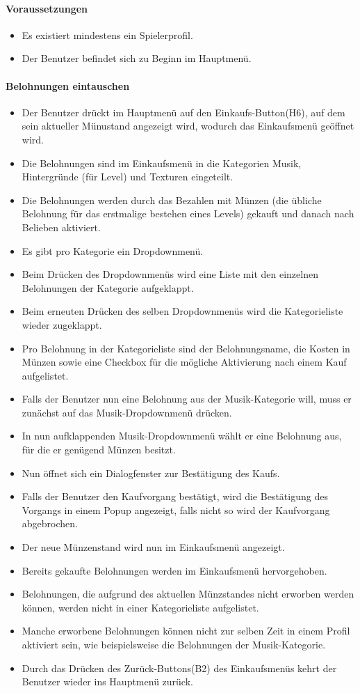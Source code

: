 \paragraph{Voraussetzungen}
\begin{itemize}
	\item Es existiert mindestens ein Spielerprofil.
	\item Der Benutzer befindet sich zu Beginn im Hauptmenü.
\end{itemize}
\paragraph{Belohnungen eintauschen}
\begin{itemize}
	\item Der Benutzer drückt im Hauptmenü auf den Einkaufs-Button(H6), auf dem sein aktueller Münustand angezeigt wird, wodurch das Einkaufsmenü geöffnet wird.
	\item Die Belohnungen sind im Einkaufsmenü in die Kategorien Musik, Hintergründe (für Level) und Texturen eingeteilt.
	\item Die Belohnungen werden durch das Bezahlen mit Münzen (die übliche Belohnung für das erstmalige bestehen eines Levels) gekauft und danach nach Belieben aktiviert.
	\item Es gibt pro Kategorie ein Dropdownmenü.
	\item Beim Drücken des Dropdownmenüs wird eine Liste mit den einzelnen Belohnungen der Kategorie aufgeklappt.
	\item Beim erneuten Drücken des selben Dropdownmenüs wird die Kategorieliste wieder zugeklappt.
	\item Pro Belohnung in der Kategorieliste sind der Belohnungsname, die Kosten in Münzen sowie eine Checkbox für die mögliche Aktivierung nach einem Kauf aufgelistet.
	\item Falls der Benutzer nun eine Belohnung aus der Musik-Kategorie will, muss er zunächst auf das Musik-Dropdownmenü drücken.
	\item In nun aufklappenden Musik-Dropdownmenü wählt er eine Belohnung aus, für die er genügend Münzen besitzt.
	\item Nun öffnet sich ein Dialogfenster zur Bestätigung des Kaufs.
	\item Falls der Benutzer den Kaufvorgang bestätigt, wird die Bestätigung des Vorgangs in einem Popup angezeigt, falls nicht so wird der Kaufvorgang abgebrochen.
	\item Der neue Münzenstand wird nun im Einkaufsmenü angezeigt.
	\item Bereits gekaufte Belohnungen werden im Einkaufsmenü hervorgehoben.
	\item Belohnungen, die aufgrund des aktuellen Münzstandes nicht erworben werden können, werden nicht in einer Kategorieliste aufgelistet.
	\item Manche erworbene Belohnungen können nicht zur selben Zeit in einem Profil aktiviert sein, wie beispielsweise die Belohnungen der Musik-Kategorie.
	\item Durch das Drücken des Zurück-Buttons(B2) des Einkaufsmenüs kehrt der Benutzer wieder ins Hauptmenü zurück.
\end{itemize}

